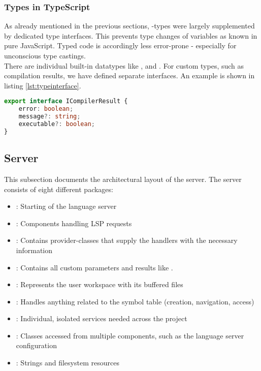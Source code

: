 \subsubsection{Types in TypeScript}
As already mentioned in the previous sections, -types were largely supplemented by dedicated type interfaces.
This prevents type changes of variables as known in pure JavaScript.
Typed code is accordingly less error-prone - especially for unconscious type castings. \\

There are individual built-in datatypes like ,  and  \cite{ts-types}.
For custom types, such as compilation results, we have defined separate interfaces.
An example is shown in listing \ref{lst:typeinterface}.

\begin{lstlisting}[language=typescript, caption={Type Interface Supplementing \code{any}-types}, captionpos=b, label={lst:typeinterface}]
export interface ICompilerResult {
    error: boolean;
    message?: string;
    executable?: boolean;
}
\end{lstlisting}




\subsection{Server}
This subsection documents the architectural layout of the server.
The server consists of eight different packages:
\begin{itemize}
    \item {}: Starting of the language server
    \item {}: Components handling LSP requests
    \item {}: Contains provider-classes that supply the handlers with the necessary information
    \item {}: Contains all custom parameters and results like .
    \item {}: Represents the user workspace with its buffered files
    \item {}: Handles anything related to the symbol table (creation, navigation, access)
    \item {}: Individual, isolated services needed across the project
    \item {}: Classes accessed from multiple components, such as the language server configuration
    \item {}: Strings and filesystem resources
\end{itemize}

